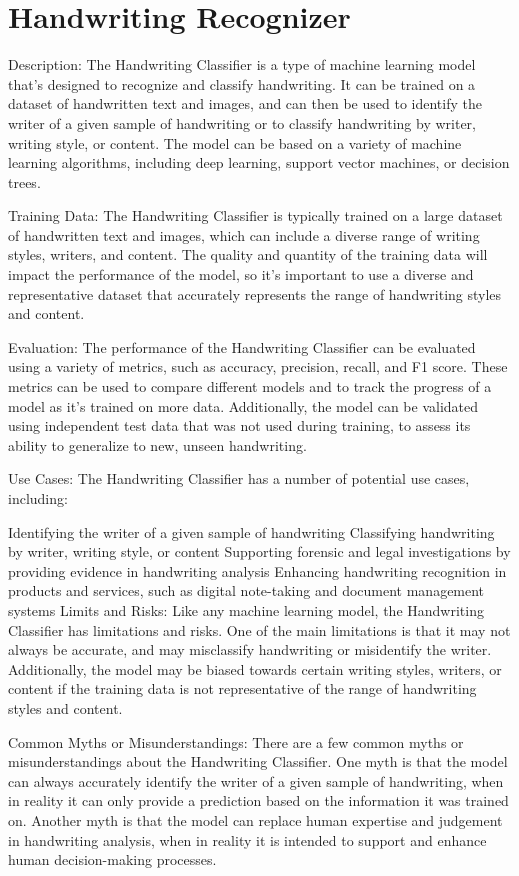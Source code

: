 \section{Handwriting Recognizer}

Description:
The Handwriting Classifier is a type of machine learning model that's designed to recognize and classify handwriting. It can be trained on a dataset of handwritten text and images, and can then be used to identify the writer of a given sample of handwriting or to classify handwriting by writer, writing style, or content. The model can be based on a variety of machine learning algorithms, including deep learning, support vector machines, or decision trees.

Training Data:
The Handwriting Classifier is typically trained on a large dataset of handwritten text and images, which can include a diverse range of writing styles, writers, and content. The quality and quantity of the training data will impact the performance of the model, so it's important to use a diverse and representative dataset that accurately represents the range of handwriting styles and content.

Evaluation:
The performance of the Handwriting Classifier can be evaluated using a variety of metrics, such as accuracy, precision, recall, and F1 score. These metrics can be used to compare different models and to track the progress of a model as it's trained on more data. Additionally, the model can be validated using independent test data that was not used during training, to assess its ability to generalize to new, unseen handwriting.

Use Cases:
The Handwriting Classifier has a number of potential use cases, including:

Identifying the writer of a given sample of handwriting
Classifying handwriting by writer, writing style, or content
Supporting forensic and legal investigations by providing evidence in handwriting analysis
Enhancing handwriting recognition in products and services, such as digital note-taking and document management systems
Limits and Risks:
Like any machine learning model, the Handwriting Classifier has limitations and risks. One of the main limitations is that it may not always be accurate, and may misclassify handwriting or misidentify the writer. Additionally, the model may be biased towards certain writing styles, writers, or content if the training data is not representative of the range of handwriting styles and content.

Common Myths or Misunderstandings:
There are a few common myths or misunderstandings about the Handwriting Classifier. One myth is that the model can always accurately identify the writer of a given sample of handwriting, when in reality it can only provide a prediction based on the information it was trained on. Another myth is that the model can replace human expertise and judgement in handwriting analysis, when in reality it is intended to support and enhance human decision-making processes.


